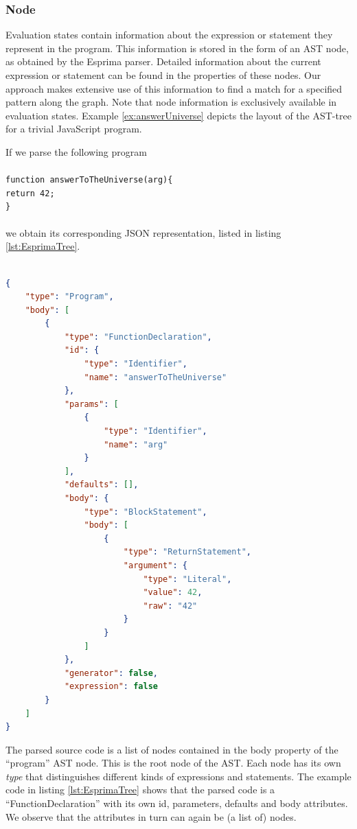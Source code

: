 \subsubsection*{Node}

Evaluation states contain information about the expression or statement they represent in the program. This information is stored in the form of an AST node, as obtained by the Esprima parser. Detailed information about the current expression or statement can be found in the properties of these nodes. Our approach makes extensive use of this information to find a match for a specified pattern along the graph. Note that node information is exclusively available in evaluation states. Example \ref{ex:answerUniverse} depicts the layout of the AST-tree for a trivial JavaScript program.

\begin{exmp}
\label{ex:answerUniverse}
If we parse the following program \\\\
\texttt{function answerToTheUniverse(arg)\{}\\
\phantom{ }\phantom{ }\phantom{ }\phantom{ }\texttt{return 42;}\\
\texttt{\}}\\
\\
we obtain its corresponding JSON representation, listed in listing \ref{lst:EsprimaTree}.
\\
\begin{lstlisting}[label={lst:EsprimaTree},language=JSON,caption=Parsed JavaScript program AST, mathescape=true]  % float=t?

{
    "type": "Program",
    "body": [
        {
            "type": "FunctionDeclaration",
            "id": {
                "type": "Identifier",
                "name": "answerToTheUniverse"
            },
            "params": [
                {
                    "type": "Identifier",
                    "name": "arg"
                }
            ],
            "defaults": [],
            "body": {
                "type": "BlockStatement",
                "body": [
                    {
                        "type": "ReturnStatement",
                        "argument": {
                            "type": "Literal",
                            "value": 42,
                            "raw": "42"
                        }
                    }
                ]
            },
            "generator": false,
            "expression": false
        }
    ]
}
\end{lstlisting}

The parsed source code is a list of nodes contained in the body property of the ``program'' AST node. This is the root node of the AST. Each node has its own \textit{type} that distinguishes different kinds of expressions and statements. The example code in listing \ref{lst:EsprimaTree} shows that the parsed code is a ``FunctionDeclaration'' with its own id, parameters, defaults and body attributes. We observe that the attributes in turn can again be (a list of) nodes.

\end{exmp}

